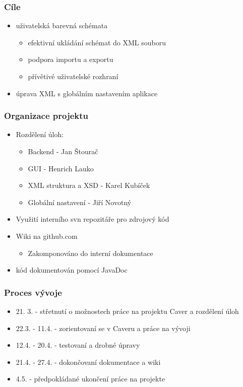 \documentclass[slovak]{beamer}
\begin{document}
\begin{frame}
\frametitle{Cíle}
	\begin{itemize}
		\item uživatelská barevná schémata
		\begin{itemize}
			\item efektivní ukládání schémat do XML souboru
			\item podpora importu a exportu
			\item přívětivé uživatelské rozhraní
		\end{itemize}
		\item úprava XML s globálním nastavením aplikace
	\end{itemize}
\end{frame}

\begin{frame}
\frametitle{Organizace projektu}
	\begin{itemize}
		\item Rozdělení úloh:
		\begin{itemize}
			\item Backend - Jan Štourač
			\item GUI - Henrich Lauko
			\item XML struktura a XSD - Karel Kubíček
			\item Globální nastavení - Jiří Novotný
		\end{itemize}
		\item Využití interního svn repozitáře pro zdrojový kód
		\item Wiki na github.com
		\begin{itemize}
			\item Zakomponováno do interní dokumentace
		\end{itemize}
		\item kód dokumentován pomocí JavaDoc
	\end{itemize}
\end{frame}

\begin{frame}
\frametitle{Proces vývoje}
	\begin{itemize}
		\item 21. 3. - střetnutí o možnostech práce na projektu Caver a rozdělení úloh
		\item 22.3. - 11.4. - zorientovaní se v Caveru a práce na vývoji
		\item 12.4. - 20.4. - testovaní a drobné úpravy
		\item 21.4. - 27.4. - dokončovaní dokumentace a wiki
		\item 4.5. - předpokládané ukončení práce na projekte
	\end{itemize}
\end{frame}
\end{document}
